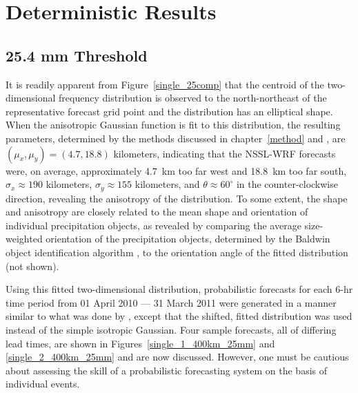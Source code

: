 

\section{Deterministic Results}
\label{dresults}


\subsection{25.4 mm Threshold}
\label{dresults_25.4mm}

It is readily apparent from \mbox{Figure \ref{single_25comp}} that the centroid of the two-dimensional frequency distribution is observed to the north-northeast of the representative forecast grid point and the distribution has an elliptical shape.
When the anisotropic Gaussian function is fit to this distribution, the resulting parameters, determined by the methods discussed in \mbox{chapter \ref{method}} and \cite{Lak2010}, are $(\mu_x, \mu_y) = (4.7, 18.8)$ kilometers, indicating that the NSSL-WRF forecasts were, on average, approximately \mbox{4.7 km} too far west and \mbox{18.8 km} too far south, $\sigma_x \approx 190$ kilometers, $\sigma_y \approx 155$ kilometers, and $\theta \approx 60^{\circ}$ in the counter-clockwise direction, revealing the anisotropy of the distribution.
To some extent, the shape and anisotropy are closely related to the mean shape and orientation of individual precipitation objects, as revealed by comparing the average size-weighted orientation of the precipitation objects, determined by the Baldwin object identification algorithm \citep{Baldwin2005}, to the orientation angle of the fitted distribution (not shown).


Using this fitted two-dimensional distribution, probabilistic forecasts for each \mbox{6-hr} time period from 01 April 2010 --- 31 March 2011 were generated in a manner similar to what was done by \cite{Sobash2011}, except that the shifted, fitted distribution was used instead of the simple isotropic Gaussian.
Four sample forecasts, all of differing lead times, are shown in \mbox{Figures \ref{single_1_400km_25mm}} and \ref{single_2_400km_25mm} and are now discussed.
However, one must be cautious about assessing the skill of a probabilistic forecasting system on the basis of individual events.


